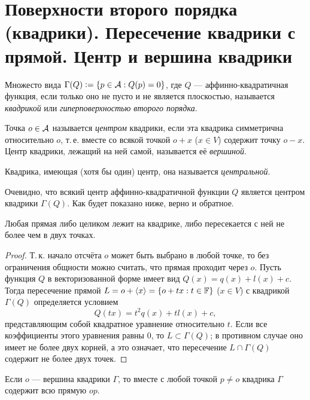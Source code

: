 \section{Поверхности второго порядка (квадрики). Пересечение квадрики с прямой. Центр и вершина квадрики}

\begin{definition}
    Множесто вида $\Gamma(Q) \vcentcolon = \{p \in \mathcal{A} : Q(p) = 0\}$, где $Q$ --- аффинно-квадратичная функция, если только оно не пусто и не является плоскостью, называется \textit{квадрикой} или \textit{гиперповерхностью второго порядка}.
\end{definition}

\begin{definition}
    Точка $o \in \mathcal{A}$ называется \textit{центром} квадрики, если эта квадрика симметрична относительно $o$, т.\,е. вместе со всякой точкой $o + x$ ($x \in V$) содержит точку $o - x$. Центр квадрики, лежащий на ней самой, называется её \textit{вершиной}.

    Квадрика, имеющая (хотя бы один) центр, она называется \textit{центральной}.
\end{definition}

Очевидно, что всякий центр аффинно-квадратичной функции $Q$ является центром квадрики $\Gamma(Q)$. Как будет показано ниже, верно и обратное.

\begin{proposal}
    Любая прямая либо целиком лежит на квадрике, либо пересекается с ней не более чем в двух точках.
\end{proposal}

\begin{proof}
    Т.\,к. начало отсчёта $o$ может быть выбрано в любой точке, то без ограничения общности можно считать, что прямая проходит через $o$. Пусть функция $Q$ в векторизованной форме имеет вид $Q(x) = q(x) + l(x) + c$. Тогда пересечение прямой $L = o + \langle x\rangle = \{o + tx : t \in \mathbb{F}\}$ ($x \in V$) с квадрикой $\Gamma(Q)$ определяется условием
    \[
        Q(tx) = t^2q(x) + tl(x) + c,
    \]
    представляющим собой квадратное уравнение относительно $t$. Если все коэффициенты этого уравнения равны $0$, то $L \subset \Gamma(Q)$; в противном случае оно имеет не более двух корней, а это означает, что пересечение $L \cap \Gamma(Q)$ содержит не более двух точек.
\end{proof}

\begin{proposal}
    Если $o$ --- вершина квадрики $\Gamma$, то вместе с любой точкой $p \ne o$ квадрика $\Gamma$ содержит всю прямую $op$.
\end{proposal}

